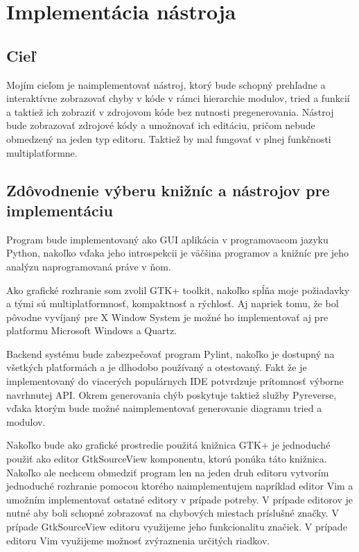 \documentclass[11pt,oneside,final]{fithesis2}
\begin{document}
\chapter{Implementácia nástroja}
	\section{Cieľ}
	
	Mojím cieľom je naimplementovať nástroj, ktorý bude schopný prehľadne a interaktívne zobrazovať chyby v kóde v rámci hierarchie modulov, tried a funkcií a taktiež ich zobraziť v zdrojovom kóde bez nutnosti pregenerovania. Nástroj bude zobrazovať zdrojové kódy a umožnovať ich editáciu, pričom nebude obmedzený na jeden typ editoru. Taktiež by mal fungovať v plnej funkčnosti multiplatformne.
	
	\section{Zdôvodnenie výberu knižníc a nástrojov pre implementáciu}
		Program bude implementovaný ako GUI aplikácia v programovacom jazyku Python, nakoľko vďaka jeho introspekcii je väčšina programov a knižníc pre jeho analýzu naprogramovaná práve v ňom.
		
		Ako grafické rozhranie som zvolil GTK+ toolkit, nakoľko spĺňa moje požiadavky a tými sú multiplatformnosť, kompaktnosť a rýchlosť. Aj napriek tomu, že bol pôvodne vyvíjaný pre X Window System je možné ho implementovať aj pre platformu Microsoft Windows a Quartz.
		
		Backend systému bude zabezpečovať program Pylint, nakoľko je dostupný na všetkých platformách a je dlhodobo používaný a otestovaný. Fakt že je implementovaný do viacerých populárnych IDE potvrdzuje prítomnosť výborne navrhnutej API. Okrem generovania chýb poskytuje taktiež služby Pyreverse, vďaka ktorým bude možné naimplementovať generovanie diagramu tried a modulov.
		
		Nakoľko bude ako grafické prostredie použitá knižnica GTK+ je jednoduché použiť ako editor GtkSourceView komponentu, ktorú ponúka táto knižnica. Nakoľko ale nechcem obmedziť program len na jeden druh editoru vytvorím jednoduché rozhranie pomocou ktorého naimplementujem napríklad editor Vim a umožním implementovať ostatné editory v prípade potreby. V prípade editorov je nutné aby boli schopné zobrazovať na chybových miestach príslušné značky. V prípade GtkSourceView editoru využijeme jeho funkcionalitu značiek. V prípade editoru Vim využijeme možnosť zvýraznenia určitých riadkov.
		
\end{document}
